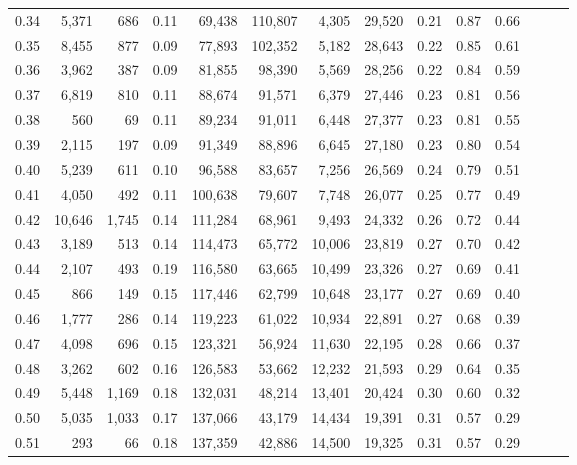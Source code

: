 \begin{tabular}{rrrrrrrrrrrrrr}
0.34 &   5,371 &    686 &  0.11 &   69,438 &  110,807 &   4,305 &  29,520 &  0.21 &  0.87 &      0.66 \\
0.35 &   8,455 &    877 &  0.09 &   77,893 &  102,352 &   5,182 &  28,643 &  0.22 &  0.85 &      0.61 \\
0.36 &   3,962 &    387 &  0.09 &   81,855 &   98,390 &   5,569 &  28,256 &  0.22 &  0.84 &      0.59 \\
0.37 &   6,819 &    810 &  0.11 &   88,674 &   91,571 &   6,379 &  27,446 &  0.23 &  0.81 &      0.56 \\
0.38 &     560 &     69 &  0.11 &   89,234 &   91,011 &   6,448 &  27,377 &  0.23 &  0.81 &      0.55 \\
0.39 &   2,115 &    197 &  0.09 &   91,349 &   88,896 &   6,645 &  27,180 &  0.23 &  0.80 &      0.54 \\
0.40 &   5,239 &    611 &  0.10 &   96,588 &   83,657 &   7,256 &  26,569 &  0.24 &  0.79 &      0.51 \\
0.41 &   4,050 &    492 &  0.11 &  100,638 &   79,607 &   7,748 &  26,077 &  0.25 &  0.77 &      0.49 \\
0.42 &  10,646 &  1,745 &  0.14 &  111,284 &   68,961 &   9,493 &  24,332 &  0.26 &  0.72 &      0.44 \\
0.43 &   3,189 &    513 &  0.14 &  114,473 &   65,772 &  10,006 &  23,819 &  0.27 &  0.70 &      0.42 \\
0.44 &   2,107 &    493 &  0.19 &  116,580 &   63,665 &  10,499 &  23,326 &  0.27 &  0.69 &      0.41 \\
0.45 &     866 &    149 &  0.15 &  117,446 &   62,799 &  10,648 &  23,177 &  0.27 &  0.69 &      0.40 \\
0.46 &   1,777 &    286 &  0.14 &  119,223 &   61,022 &  10,934 &  22,891 &  0.27 &  0.68 &      0.39 \\
0.47 &   4,098 &    696 &  0.15 &  123,321 &   56,924 &  11,630 &  22,195 &  0.28 &  0.66 &      0.37 \\
0.48 &   3,262 &    602 &  0.16 &  126,583 &   53,662 &  12,232 &  21,593 &  0.29 &  0.64 &      0.35 \\
0.49 &   5,448 &  1,169 &  0.18 &  132,031 &   48,214 &  13,401 &  20,424 &  0.30 &  0.60 &      0.32 \\
0.50 &   5,035 &  1,033 &  0.17 &  137,066 &   43,179 &  14,434 &  19,391 &  0.31 &  0.57 &      0.29 \\
0.51 &     293 &     66 &  0.18 &  137,359 &   42,886 &  14,500 &  19,325 &  0.31 &  0.57 &      0.29 \\

\end{tabular}
